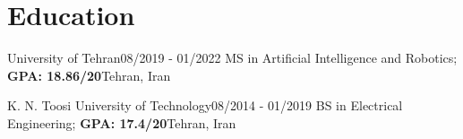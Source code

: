 
\section{Education}

  \resumeSubHeadingListStart
      
      \resumeSubheading
      {University of Tehran}{08/2019 - 01/2022}
      {MS in Artificial Intelligence and Robotics; \textbf{GPA: 18.86/20}}{Tehran, Iran}

      \resumeSubheading
      {K. N. Toosi University of Technology}{08/2014 - 01/2019}
      {BS in Electrical Engineering; \textbf{GPA: 17.4/20}}{Tehran, Iran}
    
  \resumeSubHeadingListEnd